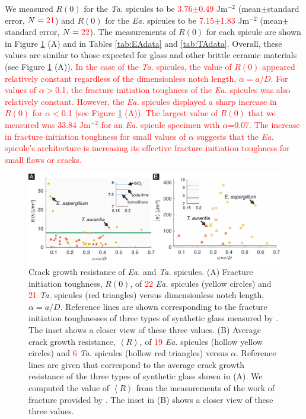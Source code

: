 \documentclass[12pt,onecolumn]{article}
\makeatletter
\newcommand{\TA}{\textit{Ta.\@}\xspace}
\newcommand{\EA}{\textit{Ea.\@}\xspace}
\makeatother
\begin{document}
\begin{bibunit}
We measured $R(0)$ for the \TA spicules to be \textcolor{red}{3.76$\pm$0.49} Jm$^{-2}$ (mean$\pm$standard error, $N=\textcolor{red}{21}$) and $R(0)$ for the \EA spicules to be \textcolor{red}{7.15$\pm$1.83} Jm$^{-2}$ (mean$\pm$standard error, $N=\textcolor{red}{22}$). The measurements of $R(0)$ for each spicule are shown in Figure \ref{fig:R} (A) and in Tables \ref{tab:EAdata} and \ref{tab:TAdata}. Overall, these values are similar to those expected for glass and other brittle ceramic materials (see Figure \ref{fig:R} (A)). \textcolor{red}{In the case of the \TA spicules, the value of $R(0)$ appeared relatively constant regardless of the dimensionless notch length, $\alpha=a/D$. For values of $\alpha>$0.1, the fracture initiation toughness of the \EA spicules was also relatively constant. However, the \EA spicules displayed a sharp increase in $R(0)$ for $\alpha<$0.1 (see Figure \ref{fig:R} (A)). The largest value of $R(0)$ that we measured was 33.84 Jm$^{-2}$ for an \EA spicule specimen with $\alpha$=0.07. The increase in fracture initiation toughness for small values of $\alpha$ suggests that the \EA spicule's architecture is increasing its effective fracture initiation toughness for small flaws or cracks.}
%
			\begin{figure}[ht!]
			\centering
			\includegraphics[width=\textwidth]{../Figures/FigureR/Figure5_V7.pdf}
			\caption{Crack growth resistance of \EA and \TA spicules. (A) Fracture initiation toughness, $R(0)$, of \textcolor{red}{22} \EA spicules (yellow circles) and \textcolor{red}{21} \TA spicules (red triangles) versus dimensionless notch length, $\alpha=a/D$. Reference lines are shown corresponding to the fracture initiation toughnesses of three types of synthetic glass measured by \cite{wiederhorn1969fracture}. The inset shows a closer view of these three values. (B) Average crack growth resistance, $\left< R \right>$, of \textcolor{red}{19} \EA spicules (hollow yellow circles) and \textcolor{red}{6} \TA spicules (hollow red triangles) versus $\alpha$.  Reference lines are given that correspond to the average crack growth resistance of the three types of synthetic glass shown in (A). We computed the value of $\left< R \right>$ from the measurements of the work of fracture provided by \cite{wiederhorn1969fracture}. The inset in (B) shows a closer view of these three values.}
			\label{fig:R}
			\end{figure}


\end{bibunit}
\end{document}
